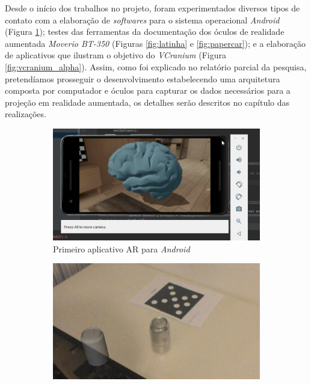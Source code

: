 Desde o início dos trabalhos no projeto, foram experimentados diversos tipos de contato com a elaboração de \textit{softwares} para o sistema operacional \textit{Android} (Figura \ref{fig:sceneform}); testes das ferramentas da documentação dos óculos de realidade aumentada \textit{Moverio BT-350} (Figuras \ref{fig:latinha} e \ref{fig:papercar}); e a elaboração de aplicativos que ilustram o objetivo do \textit{VCranium} (Figura \ref{fig:vcranium_alpha}). Assim, como foi explicado no relatório parcial da pesquisa, pretendíamos prosseguir o desenvolvimento estabelecendo uma arquitetura composta por computador e óculos para capturar os dados necessários para a projeção em realidade aumentada, os detalhes serão descritos no capítulo das realizações.

\begin{figure}[ht]
\centering
    \begin{subfigure}{0.45\textwidth}
        \centering
        \includegraphics[width=.95\textwidth]{figuras/sceneform.png}
        \caption{Primeiro aplicativo AR para \textit{Android}}
        \label{fig:sceneform}
    \end{subfigure}
    \begin{subfigure}{0.45\textwidth}
        \centering
        \includegraphics[width=.95\linewidth]{figuras/Latinha-errada.png}

\end{subfigure}
\end{figure}
